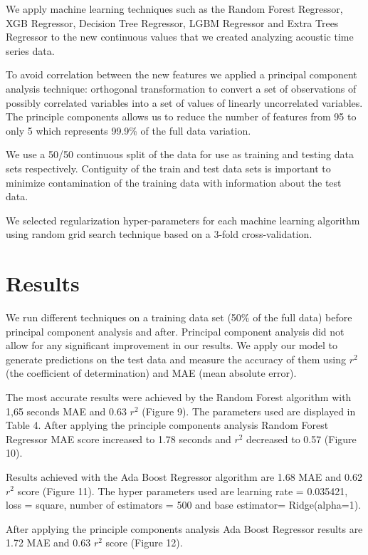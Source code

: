 \documentclass[]{llncs} %
\begin{document}
We apply machine learning techniques such as the Random Forest Regressor, XGB Regressor,  Decision Tree Regressor, LGBM Regressor and Extra Trees Regressor to the new continuous values that we created analyzing acoustic time series data. \par
To avoid correlation between the new features we applied a principal component analysis technique: orthogonal transformation to convert a set of observations of possibly correlated variables into a set of values of linearly uncorrelated variables. The principle components allows us to reduce the number of features from 95 to only 5 which represents 99.9\% of the full data variation. \par
We use a 50/50 continuous split of the data for use as training and testing data sets respectively. Contiguity of the train and test data sets is important to minimize contamination of the training data with information about the test data. \par
We selected regularization hyper-parameters for each machine learning algorithm using random grid search technique based on a 3-fold cross-validation.
\section{Results}
We run different techniques on a training data set (50\% of the full data) before principal component analysis and after. Principal component analysis did not allow for any significant improvement in our results. We apply our model to generate predictions on the test data  and measure the accuracy of them using $r^2$ (the coefficient of determination) and MAE (mean absolute error). \par 

The most accurate results were achieved by the Random Forest algorithm with 1,65 seconds MAE and 0.63 $r^2$ (Figure 9). The parameters used are displayed in Table 4. %
After applying the principle components analysis Random Forest Regressor MAE score increased to 1.78 seconds and $r^2$ decreased to 0.57 (Figure 10).\par 
Results achieved with the Ada Boost Regressor algorithm are 1.68 MAE and 0.62 $r^2$ score (Figure 11). The hyper parameters used are learning rate = 0.035421, loss = square, number of estimators = 500 and base estimator= Ridge(alpha=1). \par 
After applying the principle components analysis Ada Boost Regressor results are 1.72 MAE and 0.63 $r^2$ score (Figure 12).\par 
\end{document}
